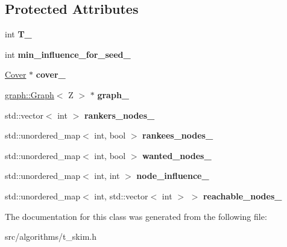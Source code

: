 \subsection*{Protected Attributes}
\begin{DoxyCompactItemize}
\item 
\hypertarget{classall__distance__sketch_1_1TSkimBase_a6696be3e044b45f74c0611f7fb7dab6b}{}int {\bfseries T\+\_\+}\label{classall__distance__sketch_1_1TSkimBase_a6696be3e044b45f74c0611f7fb7dab6b}

\item 
\hypertarget{classall__distance__sketch_1_1TSkimBase_ab4557b968fa626f627941a8fd6e9477f}{}int {\bfseries min\+\_\+influence\+\_\+for\+\_\+seed\+\_\+}\label{classall__distance__sketch_1_1TSkimBase_ab4557b968fa626f627941a8fd6e9477f}

\item 
\hypertarget{classall__distance__sketch_1_1TSkimBase_a16c599359159c78738946fc9f0b51134}{}\hyperlink{classall__distance__sketch_1_1Cover}{Cover} $\ast$ {\bfseries cover\+\_\+}\label{classall__distance__sketch_1_1TSkimBase_a16c599359159c78738946fc9f0b51134}

\item 
\hypertarget{classall__distance__sketch_1_1TSkimBase_a87a1c5d5c361d40e453668889238f82e}{}\hyperlink{classall__distance__sketch_1_1graph_1_1Graph}{graph\+::\+Graph}$<$ Z $>$ $\ast$ {\bfseries graph\+\_\+}\label{classall__distance__sketch_1_1TSkimBase_a87a1c5d5c361d40e453668889238f82e}

\item 
\hypertarget{classall__distance__sketch_1_1TSkimBase_a5022127245fdcc2cc5ae48d176862111}{}std\+::vector$<$ int $>$ {\bfseries rankers\+\_\+nodes\+\_\+}\label{classall__distance__sketch_1_1TSkimBase_a5022127245fdcc2cc5ae48d176862111}

\item 
\hypertarget{classall__distance__sketch_1_1TSkimBase_a600142c224e4db501198d939b35e5212}{}std\+::unordered\+\_\+map$<$ int, bool $>$ {\bfseries rankees\+\_\+nodes\+\_\+}\label{classall__distance__sketch_1_1TSkimBase_a600142c224e4db501198d939b35e5212}

\item 
\hypertarget{classall__distance__sketch_1_1TSkimBase_a34fdd3df68618943532311530b316978}{}std\+::unordered\+\_\+map$<$ int, bool $>$ {\bfseries wanted\+\_\+nodes\+\_\+}\label{classall__distance__sketch_1_1TSkimBase_a34fdd3df68618943532311530b316978}

\item 
\hypertarget{classall__distance__sketch_1_1TSkimBase_aa0551fbe6332f402873d5ceff1291282}{}std\+::unordered\+\_\+map$<$ int, int $>$ {\bfseries node\+\_\+influence\+\_\+}\label{classall__distance__sketch_1_1TSkimBase_aa0551fbe6332f402873d5ceff1291282}

\item 
\hypertarget{classall__distance__sketch_1_1TSkimBase_a33fac25371d3b5c087eb00fcff41239b}{}std\+::unordered\+\_\+map$<$ int, std\+::vector$<$ int $>$ $>$ {\bfseries reachable\+\_\+nodes\+\_\+}\label{classall__distance__sketch_1_1TSkimBase_a33fac25371d3b5c087eb00fcff41239b}

\end{DoxyCompactItemize}


The documentation for this class was generated from the following file\+:\begin{DoxyCompactItemize}
\item 
src/algorithms/t\+\_\+skim.\+h\end{DoxyCompactItemize}
